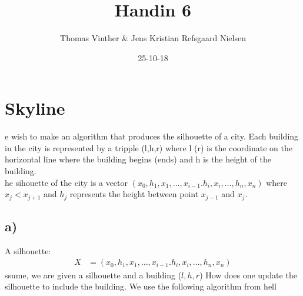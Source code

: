 \documentclass{article}
\theoremstyle{remark}
\numberwithin{equation}{section}
\begin{document}
	\author{Thomas Vinther \& Jens Kristian Refsgaard Nielsen}
	\title{Handin 6}
	\date{25-10-18}
	\maketitle
	\section{Skyline}
	e wish to make an algorithm that produces the silhouette of a city. Each building in the city is represented by a tripple (l,h,r) where l (r) is the coordinate on the horizontal line where the building begins (ends) and h is the height of the building.\\
	he sihouette of the city is a vector $(x_0,h_1,x_1,\dots,x_{i-1}.h_i,x_i,\dots,h_n,x_n)$ where $x_j<x_{j+1}$ and $h_j$ represents the height between point $x_{j-1}$ and $x_j$.\\
	\subsection{a)}
	A silhouette: %
	\begin{align}
	X&=(x_0,h_1,x_1,\dots,x_{i-1}.h_i,x_i,\dots,h_n,x_n)
	\end{align}
	ssume, we are given a silhouette and a building ($l,h,r$) How does one update the silhouette to include the building.
	We use the following algorithm from hell\\
	
\end{document}
